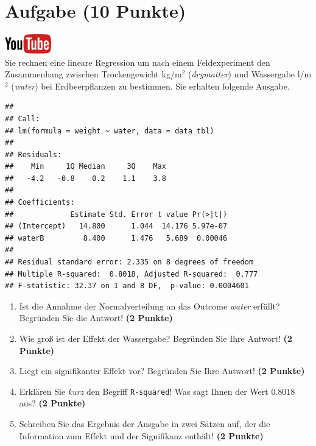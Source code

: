 \documentclass[a4paper, 9pt]{scrartcl}\usepackage[]{graphicx}\usepackage[]{xcolor}
\makeatletter
\newenvironment{kframe}{%
 \def\at@end@of@kframe{}%
 \ifinner\ifhmode%
  \def\at@end@of@kframe{\end{minipage}}%
  \begin{minipage}{\columnwidth}%
 \fi\fi%
 \def\FrameCommand##1{\hskip\@totalleftmargin \hskip-\fboxsep
 \colorbox{shadecolor}{##1}\hskip-\fboxsep
     \hskip-\linewidth \hskip-\@totalleftmargin \hskip\columnwidth}%
 \MakeFramed {\advance\hsize-\width
   \@totalleftmargin\z@ \linewidth\hsize
   \@setminipage}}%
 {\par\unskip\endMakeFramed%
 \at@end@of@kframe}
\newenvironment{knitrout}{}{} %
\makeatother
\begin{document}
\section{Aufgabe \hfill (10 Punkte)}

\hfill\href{https://youtu.be/tNNzcndrpSk}{\includegraphics[width =
  2cm]{img/youtube}}\\[1Ex]

Sie rechnen eine lineare Regression um nach einem Feldexperiment den
Zusammenhang zwischen Trockengewicht kg/m$^2$ (\textit{drymatter}) und
Wassergabe l/m$^2$ (\textit{water}) bei Erdbeerpflanzen zu bestimmen. Sie
erhalten folgende \Rlogo Ausgabe.

\begin{knitrout}
\color{fgcolor}\begin{kframe}
\begin{verbatim}
## 
## Call:
## lm(formula = weight ~ water, data = data_tbl)
## 
## Residuals:
##    Min     1Q Median     3Q    Max 
##   -4.2   -0.8    0.2    1.1    3.8 
## 
## Coefficients:
##             Estimate Std. Error t value Pr(>|t|)
## (Intercept)   14.800      1.044  14.176 5.97e-07
## waterB         8.400      1.476   5.689  0.00046
## 
## Residual standard error: 2.335 on 8 degrees of freedom
## Multiple R-squared:  0.8018,	Adjusted R-squared:  0.777 
## F-statistic: 32.37 on 1 and 8 DF,  p-value: 0.0004601
\end{verbatim}
\end{kframe}
\end{knitrout}


\begin{enumerate}
\item Ist die Annahme der Normalverteilung an das Outcome \textit{water}
  erf{\"u}llt?  Begr{\"u}nden Sie die Antwort! \textbf{(2 Punkte)}
\item Wie gro{\ss} ist der Effekt der Wassergabe?  Begr{\"u}nden Sie Ihre Antwort! \textbf{(2 Punkte)} 
\item Liegt ein signifikanter
  Effekt vor? Begr{\"u}nden Sie Ihre Antwort! \textbf{(2 Punkte)}
\item Erkl{\"a}ren Sie \textit{kurz} den Begriff \texttt{R-squared}!
  Was sagt Ihnen der Wert $0.8018$ aus? \textbf{(2 Punkte)}
\item Schreiben Sie das Ergebnis der \Rlogo Ausgabe in zwei S{\"a}tzen auf, der die
  Information zum Effekt und der Signifikanz enth{\"a}lt! \textbf{(2 Punkte)} 
\end{enumerate}
 
\end{document}
